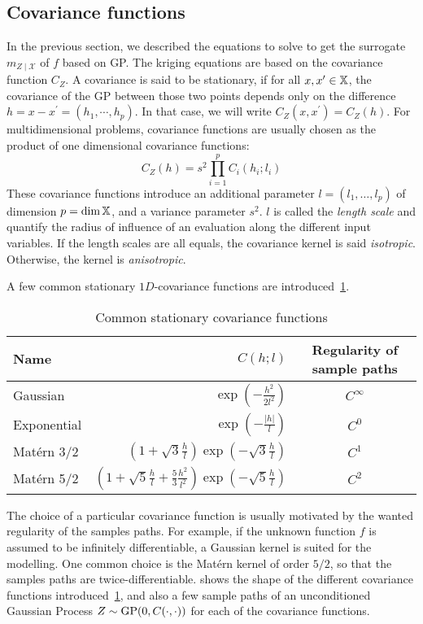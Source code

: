 \documentclass[../../Main_ManuscritThese.tex]{subfiles}
\begin{document}
\subsection{Covariance functions}
\label{sec:cov_fun}
In the previous section, we described the equations to solve to get the surrogate $m_{Z\mid \mathcal{X}}$ of $f$ based on GP.
The kriging equations are based on the covariance function $C_Z$.
A covariance is said to be stationary, if for all $x, x^{\prime} \in \mathbb{X}$, the covariance of the GP between those two points depends only on the  difference $h = x-x^{\prime}=(h_1,\cdots, h_{p})$. In that case, we will write $C_Z(x, x^{\prime}) = C_Z(h)$.
For multidimensional problems, covariance functions are usually chosen as the product of one dimensional covariance functions:
\begin{equation}
  C_Z(h) = s^2\prod_{i=1}^{p} C_i(h_i;l_i)
\end{equation}
These covariance functions introduce an additional parameter $l=(l_1,\dots,l_p)$ of dimension $p=\dim \mathbb{X}$, and a variance parameter $s^2$.
$l$ is called the \emph{length scale} and quantify the radius of influence of an evaluation along the different input variables. If the length scales are all equals, the covariance kernel is said \emph{isotropic}. Otherwise, the kernel is \emph{anisotropic}.

A few common stationary $1D$-covariance functions are introduced~\cref{tab:common_cov_fc}.

  \begin{table}[ht]
    \centering
    \begin{tabular}{lrc}
      \toprule
      Name & $C(h;l)$ & Regularity of sample paths\\ \midrule
      Gaussian & $\exp\left(- \frac{h^2}{2 l^2}\right)$ & $C^{\infty}$\\
      Exponential &$\exp\left(- \frac{\lvert h \rvert}{l}\right)$ & $C^0$  \\
      Matérn 3/2 & $\left(1 + \sqrt{3}\frac{h}{l}\right)\exp\left(-\sqrt{3}\frac{h}{l}\right)$ & $C^1$\\
      Matérn 5/2 & $\left(1+ \sqrt{5}\frac{h}{l} + \frac{5}{3}\frac{h^2}{l^2}\right) \exp\left(-\sqrt{5}\frac{h}{l}\right)$ & $C^2$\\ \bottomrule
    \end{tabular}
    \caption{\label{tab:common_cov_fc} Common stationary covariance functions}
  \end{table}

  The choice of a particular covariance function is usually motivated by the wanted regularity of the samples paths. For example, if the unknown function $f$ is assumed to be infinitely differentiable, a Gaussian kernel is suited for the modelling. One common choice is the Matérn kernel of order $5/2$, so that the samples paths are twice-differentiable.  shows the shape of the different covariance functions introduced~\cref{tab:common_cov_fc}, and also a few sample paths of an unconditioned Gaussian Process $Z\sim\operatorname{\mathrm{GP}}(0, C(\cdot, \cdot))$ for each of the covariance functions.
  
\end{document}
